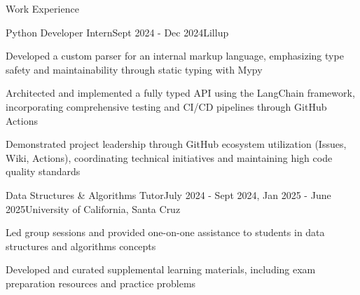 \documentclass{resume}
\begin{document}
\begin{rSection}{Work Experience}

  \begin{rSubsection}{Python Developer Intern}{Sept 2024 - Dec 2024}{Lillup}{}
  \item{} Developed a custom parser for an internal markup language,
    emphasizing type safety and maintainability through static typing with Mypy
  \item{} Architected and implemented a fully typed API using the
    LangChain framework, incorporating comprehensive testing and
    CI/CD pipelines through GitHub Actions
  \item{} Demonstrated project leadership through GitHub ecosystem
    utilization (Issues, Wiki, Actions), coordinating technical
    initiatives and maintaining high code quality standards
  \end{rSubsection}

  \begin{rSubsection}{Data Structures \& Algorithms Tutor}{July 2024
    - Sept 2024, Jan 2025 - June 2025}{University of California, Santa Cruz}{}
  \item{} Led group sessions and provided one-on-one assistance to
    students in data structures and algorithms concepts
  \item{} Developed and curated supplemental learning materials,
    including exam preparation resources and practice problems
  \end{rSubsection}

\end{rSection}
\end{document}

